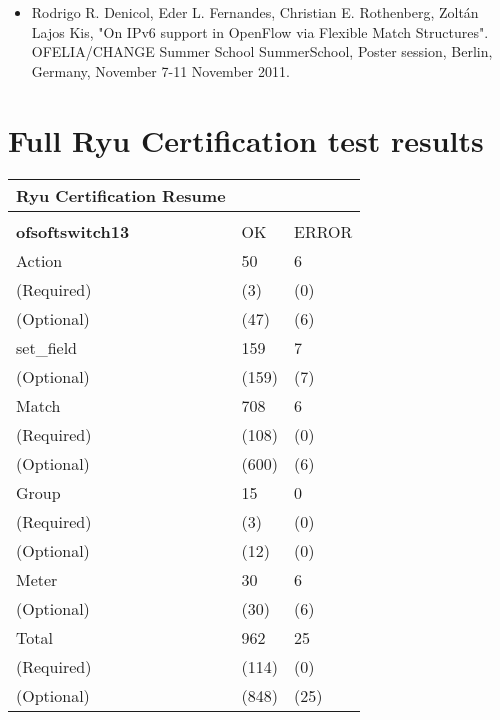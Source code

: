 \begin{anexosenv}
\begin{itemize}
    \item Rodrigo R. Denicol, Eder L. Fernandes, Christian E. Rothenberg, Zoltán Lajos Kis, "On IPv6 support in OpenFlow via Flexible Match Structures". OFELIA/CHANGE Summer School SummerSchool, Poster session, Berlin, Germany, November 7-11 November 2011.
    

\end{itemize}

\chapter{Full Ryu Certification test results }
\label{annex:ryucert}

\begin{minipage}[t][5cm][b]{\textwidth}
\begin{tabular}{|l|l|l|}
\hline
\textbf{Ryu Certification Resume} &  &  \\ \hline
 &  &  \\ \hline
\textbf{ofsoftswitch13} & OK & ERROR \\ \hline
Action & 50 & 6 \\ \hline
(Required) & (3) & (0) \\ \hline
(Optional) & (47) & (6) \\ \hline
set\_field & 159 & 7 \\ \hline
(Optional) & (159) & (7) \\ \hline
Match & 708 & 6 \\ \hline
(Required) & (108) & (0) \\ \hline
(Optional) & (600) & (6) \\ \hline
Group & 15 & 0 \\ \hline
(Required) & (3) & (0) \\ \hline
(Optional) & (12) & (0) \\ \hline
Meter & 30 & 6 \\ \hline
(Optional) & (30) & (6) \\ \hline
Total & 962 & 25 \\ \hline
(Required) & (114) & (0) \\ \hline
(Optional) & (848) & (25) \\ \hline
\end{tabular}
\end{minipage} 



\label{annex:NetPDLdesc}

\end{anexosenv}


\printindex

 
